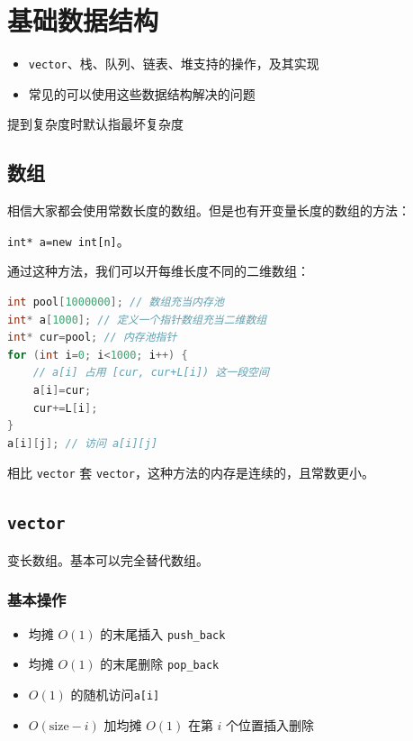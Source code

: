 \chapter{基础数据结构}

\begin{overview}
\begin{itemize}
    \item \texttt{vector}、栈、队列、链表、堆支持的操作，及其实现
    \item 常见的可以使用这些数据结构解决的问题
\end{itemize}
\end{overview}




提到复杂度时默认指最坏复杂度

\section{数组}

相信大家都会使用常数长度的数组。但是也有开变量长度的数组的方法：

\verb|int* a=new int[n]|。

通过这种方法，我们可以开每维长度不同的二维数组：
\begin{lstlisting}[language=C++]
int pool[1000000]; // 数组充当内存池
int* a[1000]; // 定义一个指针数组充当二维数组
int* cur=pool; // 内存池指针
for (int i=0; i<1000; i++) {
    // a[i] 占用 [cur, cur+L[i]) 这一段空间
    a[i]=cur; 
    cur+=L[i];
}
a[i][j]; // 访问 a[i][j]
\end{lstlisting}
相比 \texttt{vector} 套 \texttt{vector}，这种方法的内存是连续的，且常数更小。

\section{\texttt{vector}}

变长数组。基本可以完全替代数组。

\subsection{基本操作}

\begin{itemize}
    \item 均摊 $O(1)$ 的末尾插入 \texttt{push\_back}
    \item 均摊 $O(1)$ 的末尾删除 \texttt{pop\_back}
    \item $O(1)$ 的随机访问\footnotemark \texttt{a[i]}
    \item $O(\mathrm{size}-i)$ 加均摊 $O(1)$ 在第 $i$ 个位置插入删除
\end{itemize}

